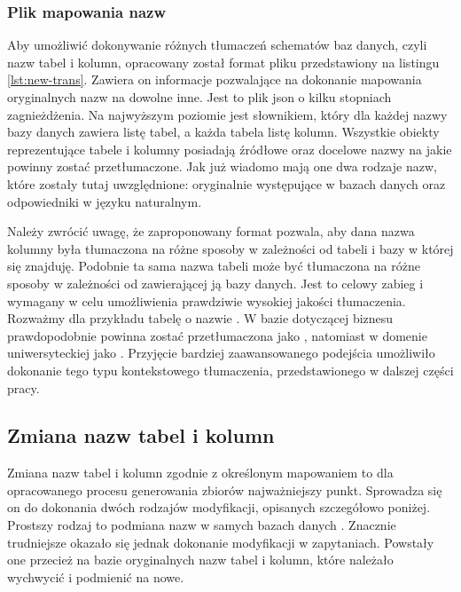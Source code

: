 \subsubsection{Plik mapowania nazw}
Aby umożliwić dokonywanie różnych tłumaczeń schematów baz danych, czyli nazw tabel i kolumn, opracowany został format pliku przedstawiony na listingu \ref{lst:new-trans}. Zawiera on informacje pozwalające na dokonanie mapowania oryginalnych nazw na dowolne inne. Jest to plik json o kilku stopniach zagnieżdżenia. Na najwyższym poziomie jest słownikiem, który dla każdej nazwy bazy danych zawiera listę tabel, a każda tabela listę kolumn. Wszystkie obiekty reprezentujące tabele i kolumny posiadają źródłowe oraz docelowe nazwy na jakie powinny zostać przetłumaczone. Jak już wiadomo mają one dwa rodzaje nazw, które zostały tutaj uwzględnione: oryginalnie występujące w bazach danych oraz odpowiedniki w języku naturalnym.

\begin{minipage}{\linewidth}

\end{minipage}

Należy zwrócić uwagę, że zaproponowany format pozwala, aby dana nazwa kolumny była tłumaczona na różne sposoby w zależności od tabeli i bazy w której się znajduję. Podobnie ta sama nazwa tabeli może być tłumaczona na różne sposoby w zależności od zawierającej ją bazy danych. Jest to celowy zabieg i wymagany w celu umożliwienia prawdziwie wysokiej jakości tłumaczenia. Rozważmy dla przykładu tabelę o nazwie . W bazie dotyczącej biznesu prawdopodobnie powinna zostać przetłumaczona jako , natomiast w domenie uniwersyteckiej jako . Przyjęcie bardziej zaawansowanego podejścia umożliwiło dokonanie tego typu kontekstowego tłumaczenia, przedstawionego w dalszej części pracy.

\subsection{Zmiana nazw tabel i kolumn}
Zmiana nazw tabel i kolumn zgodnie z określonym mapowaniem to dla opracowanego procesu generowania zbiorów najważniejszy punkt. Sprowadza się on do dokonania dwóch rodzajów modyfikacji, opisanych szczegółowo poniżej. Prostszy rodzaj to podmiana nazw w samych bazach danych . Znacznie trudniejsze okazało się jednak dokonanie modyfikacji w zapytaniach. Powstały one przecież na bazie oryginalnych nazw tabel i kolumn, które należało wychwycić i podmienić na nowe.

